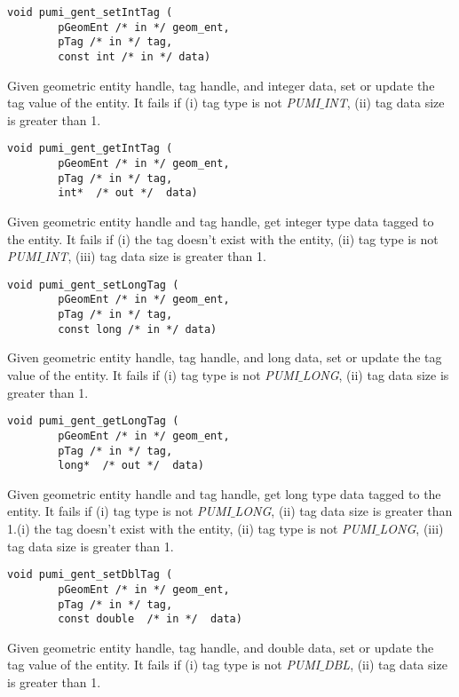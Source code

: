 \begin{verbatim}
void pumi_gent_setIntTag (
        pGeomEnt /* in */ geom_ent, 
        pTag /* in */ tag,
        const int /* in */ data)
\end{verbatim}\vspace{-.5cm}\hspace{1cm}
        Given geometric entity handle, tag handle, and integer data, set or update the tag value of the entity. It fails if (i) tag type is not \emph{PUMI}$\_$\emph{INT}, (ii) tag data size is greater than 1.

\begin{verbatim}
void pumi_gent_getIntTag (
        pGeomEnt /* in */ geom_ent, 
        pTag /* in */ tag,
        int*  /* out */  data)
\end{verbatim}\vspace{-.5cm}\hspace{1cm}
        Given geometric entity handle and tag handle, get integer type data tagged to the entity. It fails if (i) the tag doesn't exist with the entity, (ii) tag type is not \emph{PUMI}$\_$\emph{INT}, (iii) tag data size is greater than 1.

\begin{verbatim}
void pumi_gent_setLongTag (
        pGeomEnt /* in */ geom_ent, 
        pTag /* in */ tag,
        const long /* in */ data)
\end{verbatim}\vspace{-.5cm}\hspace{1cm}
        Given geometric entity handle, tag handle, and long data, set or update the tag value of the entity. It fails if (i) tag type is not \emph{PUMI}$\_$\emph{LONG}, (ii) tag data size is greater than 1.

\begin{verbatim}
void pumi_gent_getLongTag (
        pGeomEnt /* in */ geom_ent, 
        pTag /* in */ tag,
        long*  /* out */  data)
\end{verbatim}\vspace{-.5cm}\hspace{1cm}
        Given geometric entity handle and tag handle, get long type data tagged to the entity.  It fails if (i) tag type is not \emph{PUMI}$\_$\emph{LONG}, (ii) tag data size is greater than 1.(i) the tag doesn't exist with the entity, (ii) tag type is not \emph{PUMI}$\_$\emph{LONG}, (iii) tag data size is greater than 1.

\begin{verbatim}
void pumi_gent_setDblTag (
        pGeomEnt /* in */ geom_ent, 
        pTag /* in */ tag,
        const double  /* in */  data)
\end{verbatim}\vspace{-.5cm}\hspace{1cm}
        Given geometric entity handle, tag handle, and double data, set or update the tag value of the entity. It fails if (i) tag type is not \emph{PUMI}$\_$\emph{DBL}, (ii) tag data size is greater than 1.

